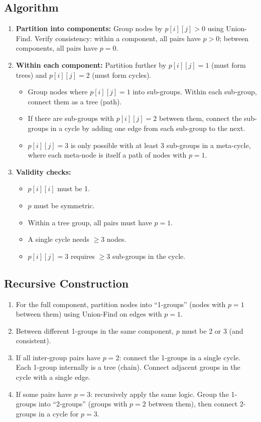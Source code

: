 \documentclass[11pt,a4paper]{article}
\begin{document}
\subsection{Algorithm}
\begin{enumerate}
  \item \textbf{Partition into components:} Group nodes by $p[i][j] > 0$ using Union-Find. Verify consistency: within a component, all pairs have $p > 0$; between components, all pairs have $p = 0$.
  \item \textbf{Within each component:} Partition further by $p[i][j] = 1$ (must form trees) and $p[i][j] = 2$ (must form cycles).
    \begin{itemize}
      \item Group nodes where $p[i][j] = 1$ into sub-groups. Within each sub-group, connect them as a tree (path).
      \item If there are sub-groups with $p[i][j] = 2$ between them, connect the sub-groups in a cycle by adding one edge from each sub-group to the next.
      \item $p[i][j] = 3$ is only possible with at least 3 sub-groups in a meta-cycle, where each meta-node is itself a path of nodes with $p = 1$.
    \end{itemize}
  \item \textbf{Validity checks:}
    \begin{itemize}
      \item $p[i][i]$ must be 1.
      \item $p$ must be symmetric.
      \item Within a tree group, all pairs must have $p = 1$.
      \item A single cycle needs $\ge 3$ nodes.
      \item $p[i][j] = 3$ requires $\ge 3$ sub-groups in the cycle.
    \end{itemize}
\end{enumerate}

\subsection{Recursive Construction}
\begin{enumerate}
  \item For the full component, partition nodes into ``1-groups'' (nodes with $p = 1$ between them) using Union-Find on edges with $p = 1$.
  \item Between different 1-groups in the same component, $p$ must be 2 or 3 (and consistent).
  \item If all inter-group pairs have $p = 2$: connect the 1-groups in a single cycle. Each 1-group internally is a tree (chain). Connect adjacent groups in the cycle with a single edge.
  \item If some pairs have $p = 3$: recursively apply the same logic. Group the 1-groups into ``2-groups'' (groups with $p = 2$ between them), then connect 2-groups in a cycle for $p = 3$.
\end{enumerate}
\end{document}
